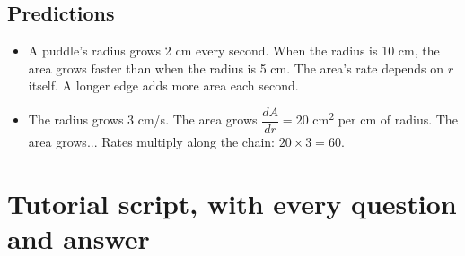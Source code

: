\documentclass[11pt]{article}
\begin{document}
\subsection*{Predictions}\begin{itemize}
\item A puddle's radius grows 2 cm every second. When the radius is 10 cm, the area grows faster than when the radius is 5 cm.  The area's rate depends on $r$ itself. A longer edge adds more area each second.
\item The radius grows 3 cm/s. The area grows $\dfrac{dA}{dr}=20$ cm\textsuperscript{2} per cm of radius. The area grows...  Rates multiply along the chain: $20\times3=60$.
\end{itemize}
\section*{Tutorial script, with every question and answer}
\end{document}
